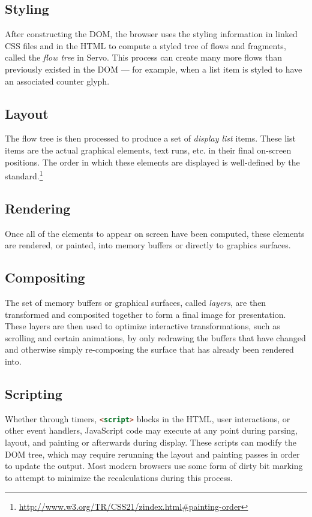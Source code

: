 \subsection{Styling}

After constructing the DOM, the browser uses the styling information in linked
CSS files and in the HTML to compute a styled tree of flows and fragments,
called the \emph{flow tree} in Servo.
This process can create many more flows than previously existed in the DOM ---
for example, when a list item is styled to have an associated counter glyph.

\subsection{Layout}

The flow tree is then processed to produce a set of \emph{display list} items.
These list items are the actual graphical elements, text runs, etc. in their
final on-screen positions.
The order in which these elements are displayed is well-defined by the
standard.\footnote{\url{http://www.w3.org/TR/CSS21/zindex.html#painting-order}}

\subsection{Rendering}

Once all of the elements to appear on screen have been computed, these
elements are rendered, or painted, into memory buffers or directly to graphics
surfaces.

\subsection{Compositing}

The set of memory buffers or graphical surfaces, called \emph{layers}, are then
transformed and composited together to form a final image for
presentation.
These layers are then used to optimize interactive transformations, such as scrolling
and certain animations, by only redrawing the buffers that have changed and
otherwise simply re-composing the surface that has already been rendered into.

\subsection{Scripting}

Whether through timers, \lstinline[language=HTML]{<script>} blocks in the
HTML, user interactions, or other event handlers, JavaScript code may execute
at any point during parsing, layout, and painting or afterwards during
display.  These scripts can modify the DOM tree, which may require rerunning
the layout and painting passes in order to update the output.  Most modern
browsers use some form of dirty bit marking to attempt to minimize the
recalculations during this process.


